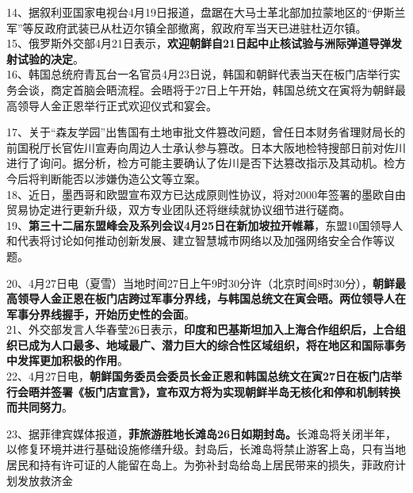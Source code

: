 14、据叙利亚国家电视台4月19日报道，盘踞在大马士革北部加拉蒙地区的``伊斯兰军''等反政府武装已从杜迈尔镇全部撤离，叙政府军当天已进驻杜迈尔镇。\\

15、俄罗斯外交部4月21日表示，{\textbf{欢迎朝鲜自21日起中止核试验与洲际弹道导弹发射试验的决定}}。\\
16、韩国总统府青瓦台一名官员4月23日说，韩国和朝鲜代表当天在板门店举行实务会谈，商定首脑会晤流程。会晤将于27日上午开始，韩国总统文在寅将为朝鲜最高领导人金正恩举行正式欢迎仪式和宴会。

17、关于``森友学园''出售国有土地审批文件篡改问题，曾任日本财务省理财局长的前国税厅长官佐川宣寿向周边人士承认参与篡改。日本大阪地检特搜部日前对佐川进行了询问。据分析，检方可能主要确认了佐川是否下达篡改指示及其动机。检方今后将判断能否以涉嫌伪造公文等立案。\\
18、近日，墨西哥和欧盟宣布双方已达成原则性协议，将对2000年签署的墨欧自由贸易协定进行更新升级，双方专业团队还将继续就协议细节进行磋商。\\
19、{\textbf{第三十二届东盟峰会及系列会议4月25日在新加坡拉开帷幕}}，东盟10国领导人和代表将讨论如何推动创新发展、建立智慧城市网络以及加强网络安全合作等议题。

20、4月27日电（夏雪）当地时间27日上午9时30分许（北京时间8时30分），{\textbf{朝鲜最高领导人金正恩在板门店跨过军事分界线，与韩国总统文在寅会晤。两位领导人在军事分界线握手，开始历史性的会面}}。\\
21、外交部发言人华春莹26日表示，{\textbf{印度和巴基斯坦加入上海合作组织后，上合组织已成为人口最多、地域最广、潜力巨大的综合性区域组织，将在地区和国际事务中发挥更加积极的作用}}。\\
22、4月27日电，{\textbf{朝鲜国务委员会委员长金正恩和韩国总统文在寅27日在板门店举行会晤并签署《板门店宣言》，宣布双方将为实现朝鲜半岛无核化和停和机制转换而共同努力}}。

23、据菲律宾媒体报道，{\textbf{菲旅游胜地长滩岛26日如期封岛。}}长滩岛将关闭半年，以修复环境并进行基础设施修缮升级。封岛后，长滩岛将禁止游客上岛，只有当地居民和持有许可证的人能留在岛上。为弥补封岛给岛上居民带来的损失，菲政府计划发放救济金
